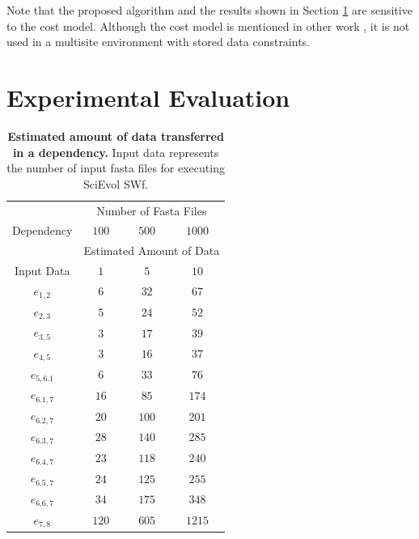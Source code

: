 Note that the proposed algorithm and the results shown in Section \ref{sec:Val} are sensitive to the cost model. Although the cost model is mentioned in other work \cite{Oliveira2012}, it is not used in a multisite environment with stored data constraints. 


\section{Experimental Evaluation}
\label{sec:Val}

\begin{table}[htbp]
\caption{\textbf{Estimated amount of data transferred in a dependency. } Input data represents the number of input fasta files for executing SciEvol SWf.} 
\label{app:DE}
\begin{centering}
\captionsetup{justification=centering}
\begin{tabular}{|c|c|c|c|}
\hline 
\multirow{ 3}{*}{Dependency} & \multicolumn{3}{|c|}{Number of Fasta Files} \\
\cline{2-4}
& $100$ & $500$ & $1000$ \\
\cline{2-4}
& \multicolumn{3}{|c|}{Estimated Amount of Data} \tabularnewline
\hline
Input Data & $1$ & $5$ & $10$ \tabularnewline
$e_{1,2}$ & $6$ & $32$ & $67$ \tabularnewline
$e_{2,3}$ & $5$ & $24$ & $52$ \tabularnewline
$e_{3,5}$ & $3$ & $17$ & $39$ \tabularnewline
$e_{4,5}$ & $3$ & $16$ & $37$ \tabularnewline
$e_{5,6.1}$ & $6$ & $33$ & $76$ \tabularnewline
$e_{6.1,7}$ & $16$ & $85$ & $174$ \tabularnewline
$e_{6.2,7}$ & $20$ & $100$ & $201$ \tabularnewline
$e_{6.3,7}$ & $28$ & $140$ & $285$ \tabularnewline
$e_{6.4,7}$ & $23$ & $118$ & $240$ \tabularnewline
$e_{6.5,7}$ & $24$ & $125$ & $255$ \tabularnewline
$e_{6.6,7}$ & $34$ & $175$ & $348$ \tabularnewline
$e_{7,8}$ & $120$ & $605$ & $1215$ \tabularnewline
\hline 
\end{tabular}
\par\end{centering} 
\end{table}

